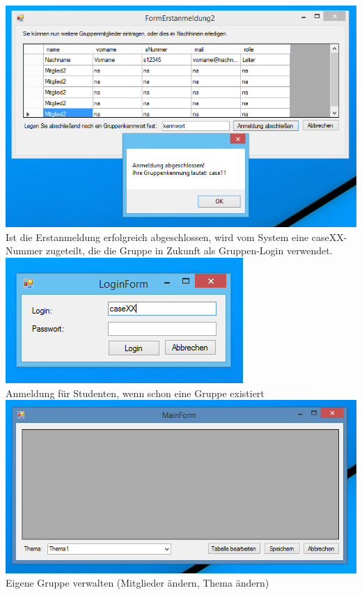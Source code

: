 \documentclass{article}
\begin{document}
\begin{center}
    \includegraphics[scale=0.8]{bilder/pic7.PNG}\\
    Ist die Erstanmeldung erfolgreich abgeschlossen, wird vom System eine caseXX-Nummer zugeteilt, die die Gruppe in Zukunft als Gruppen-Login verwendet. \\
    
    \includegraphics{bilder/pic2.PNG}\\
    Anmeldung für Studenten, wenn schon eine Gruppe existiert \\
    
    \includegraphics[scale=0.8]{bilder/pic8.PNG}\\
    Eigene Gruppe verwalten (Mitglieder ändern, Thema ändern) \\

\end{center}
\end{document}
